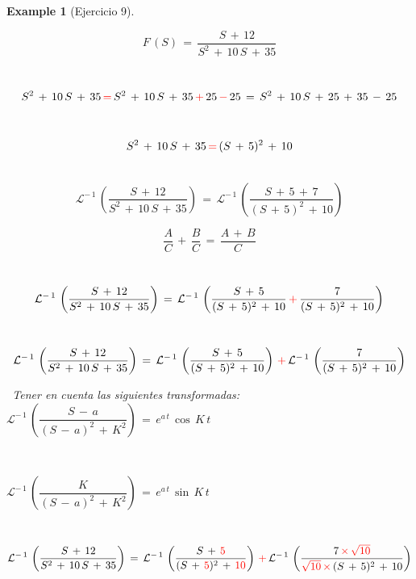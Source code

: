 \documentclass[a4paper,11pt,openany]{book}
\newtheorem{exmp}{Example}[section]
\begin{document}
\begin{exmp}[Ejercicio 9]
 
 
\
 
$$F\,(S)\,=\,\dfrac{S\,+\,12}{S^{2}\,+\,10\,S\,+\,35}$$
 
\textcolor{candyapplered}{}\, $$S^{2}\,+\,10\,S\,+\,35\,\textcolor{candyapplered}{=}\,S^{2}\,+\,10\,S\,+\,35\,\textcolor{candyapplered}{+}\,25\,\textcolor{candyapplered}{-}\,25\,=\,S^{2}\,+\,10\,S\,+\,25\,+\,35\,-\,25$$ 
 
\textcolor{candyapplered}{}\, $$S^{2}\,+\,10\,S\,+\,35\,\textcolor{candyapplered}{=}\,(S\,+\,5)^{2}\,+\,10$$
 
\textcolor{candyapplered}{}\,$$\mathcal{L}^{-\,1}\,\left(\dfrac{S\,+\,12}{S^{2}\,+\,10\,S\,+\,35} \right)\,=\,\mathcal{L}^{-\,1}\,\left(\dfrac{S\,+\,5\,+\,7}{(S\,+\,5)^{2}\,+\,10} \right)$$
 
$$\dfrac{A}{C}\,+\,\dfrac{B}{C}\,=\,\dfrac{A\,+\,B}{C}$$
 
\textcolor{candyapplered}{}\,$$\mathcal{L}^{-\,1}\,\left(\dfrac{S\,+\,12}{S^{2}\,+\,10\,S\,+\,35} \right)\,=\,\mathcal{L}^{-\,1}\,\left(\dfrac{S\,+\,5}{(S\,+\,5)^{2}\,+\,10}\,\textcolor{candyapplered}{+}\,\dfrac{7 }{(S\,+\,5)^{2}\,+\,10} \right)$$
 
\textcolor{candyapplered}{}\,$$\mathcal{L}^{-\,1}\,\left(\dfrac{S\,+\,12}{S^{2}\,+\,10\,S\,+\,35} \right)\,=\,\mathcal{L}^{-\,1}\,\left(\dfrac{S\,+\,5}{(S\,+\,5)^{2}\,+\,10} \right)\,\textcolor{candyapplered}{+}\,\mathcal{L}^{-\,1}\,\left(\dfrac{7 }{(S\,+\,5)^{2}\,+\,10} \right)$$
 
\textcolor{candyapplered}{\Info}\, Tener en cuenta las siguientes transformadas: $\mathcal{L}^{-\,1}\,\left(\dfrac{S\,-\,a}{(S\,-\,a)^{2}\,+\,K^{2}} \right)\,=\,e^{a\,t}\,\cos\,K\,t$
 
\ 
 
$\mathcal{L}^{-\,1}\,\left(\dfrac{K }{(S\,-\,a)^{2}\,+\,K^{2}} \right)\,=\,e^{a\,t}\,\sin\,K\,t$
 
\textcolor{candyapplered}{}\,$$\mathcal{L}^{-\,1}\,\left(\dfrac{S\,+\,12}{S^{2}\,+\,10\,S\,+\,35} \right)\,=\,\mathcal{L}^{-\,1}\,\left(\dfrac{S\,+\,\textcolor{candyapplered}{5} }{(S\,+\,\textcolor{candyapplered}{5})^{2}\,+\,\textcolor{candyapplered}{10}} \right)\,\textcolor{candyapplered}{+}\,\mathcal{L}^{-\,1}\,\left(\dfrac{7\,\textcolor{candyapplered}{\times\,\sqrt{10} } }{\textcolor{candyapplered}{\sqrt{10}\,\times}\, (S\,+\,5)^{2}\,+\,10} \right)$$
 

\end{exmp}
\end{document}
